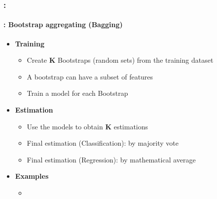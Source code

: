 \documentclass[xcolor=table]{beamer}
\begin{document}
\begin{frame}
	\frametitle{\insertshortsubtitle: \insertsection}
	\framesubtitle{\insertsubsection: Bootstrap aggregating (Bagging)}
	
	\begin{itemize}
		\item \textbf{Training}
		\begin{itemize}
			\item Create \textbf{K} Bootstraps (random sets) from the training dataset
			\item A bootstrap can have a subset of features
			\item Train a model for each Bootstrap
		\end{itemize}
		\item \textbf{Estimation}
		\begin{itemize}
			\item Use the models to obtain \textbf{K} estimations
			\item Final estimation (Classification): by majority vote
			\item Final estimation (Regression): by mathematical average
		\end{itemize}
		\item \textbf{Examples}
		\begin{itemize}
			\item {}
		\end{itemize}
	\end{itemize}
	
\end{frame}
\end{document}
